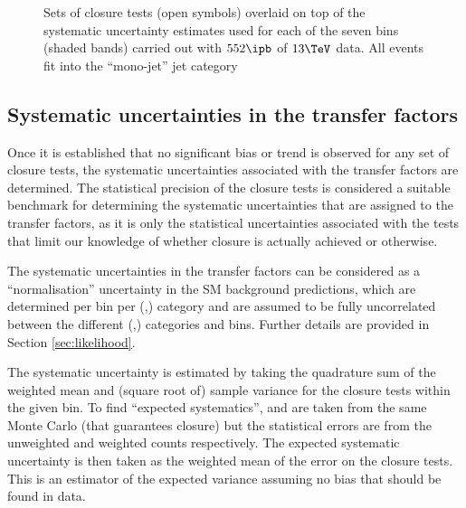 \begin{figure}[h!]
  \begin{center}
    \caption{Sets of closure tests (open symbols) overlaid on top of
      the systematic uncertainty estimates used for each of the seven
      \scalht bins (shaded bands) carried out with $552\ipb$ of
      $13\tev$ data. All events fit into the ``mono-jet'' jet
      category}
    \label{fig:closureDataMono}
  \end{center} 
\end{figure}

\subsection{Systematic uncertainties in the transfer factors\label{sec:syst-from-closure}}

Once it is established that no significant bias or trend is observed
for any set of closure tests, the systematic uncertainties associated
with the transfer factors are determined. The statistical precision of
the closure tests is considered a suitable benchmark for determining
the systematic uncertainties that are assigned to the transfer
factors, as it is only the statistical uncertainties associated with
the tests that limit our knowledge of whether closure is actually
achieved or otherwise.

The systematic uncertainties in the transfer factors can be considered
as a ``normalisation'' uncertainty in the SM background predictions,
which are determined per \scalht bin per (\njet,\nb) category and are
assumed to be fully uncorrelated between the different (\njet,\nb)
categories and \scalht bins. Further details are provided in Section
\ref{sec:likelihood}. 

The systematic uncertainty is estimated by taking the quadrature sum
of the weighted mean and (square root of) sample variance for the
closure tests within the given \scalht bin. To find ``expected
systematics'', \nobs and \npre are taken from the same Monte Carlo
(that guarantees closure) but the statistical errors are from the
unweighted and weighted counts respectively. The expected systematic
uncertainty is then taken as the weighted mean of the error on the
closure tests. This is an estimator of the expected variance assuming
no bias that should be found in data. 

